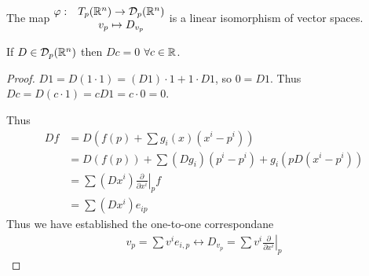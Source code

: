 \documentclass[12pt, twosided]{article}
\begin{document}
\begin{thm}
  The map \(
  \begin{matrix}
    \varphi : &T_p(\mathbb{R}^n) \to \mathcal{D}_p(\mathbb{R}^n) \\
           &v_p \mapsto D_{v_p}
  \end{matrix}\) is a linear isomorphism of vector spaces.
\end{thm}
\begin{lm}
  If \(D \in \mathcal{D}_p(\mathbb{R}^n)\) then \(Dc = 0\) \(\forall c \in \mathbb{R}\).
\end{lm}
\begin{proof}
  \(D1 = D(1 \cdot 1) = (D1) \cdot 1 + 1 \cdot D 1\), so \(0 = D1\). Thus \(Dc = D(c \cdot 1) = cD1 = c \cdot 0 = 0\).

  Thus
  \begin{align*}
    Df &= D(f(p) + \sum g_i(x)(x^i - p^i)) \\
       &= D(f(p)) + \sum (Dg_i)(p^i - p^i) + g_i(p D(x^i - p^i)) \\
       &= \sum (Dx^i)\left.\frac{\partial}{\partial x^i}\right\vert_p f \\
    &= \sum (Dx^i)e_{ip}
  \end{align*}
  Thus we have established the one-to-one correspondane
  \begin{align}
    v_p = \sum v^ie_{i,p} \longleftrightarrow D_{v_p} = \sum v^i \left.\frac{\partial}{\partial x^i}\right\vert_{p}
  \end{align}
\end{proof}
\end{document}
